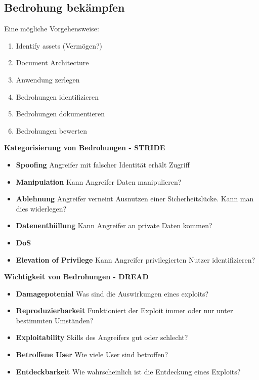 \subsection{Bedrohung bekämpfen}
Eine mögliche Vorgehensweise:
\begin{enumerate}
	\item Identify assets (Vermögen?)
	\item Document Architecture
	\item Anwendung zerlegen
	\item Bedrohungen identifizieren
	\item Bedrohungen dokumentieren
	\item Bedrohungen bewerten
\end{enumerate}

\textbf{Kategorisierung von Bedrohungen - STRIDE}
\begin{itemize}
	\item \textbf{Spoofing} Angreifer mit falscher Identität erhält Zugriff
	\item \textbf{Manipulation} Kann Angreifer Daten manipulieren?
	\item \textbf{Ablehnung} Angreifer verneint Ausnutzen einer Sicherheitslücke. Kann man dies widerlegen?
	\item \textbf{Datenenthüllung} Kann Angreifer an private Daten kommen?
	\item \textbf{DoS}
	\item \textbf{Elevation of Privilege} Kann Angreifer privilegierten Nutzer identifizieren?
\end{itemize}

\textbf{Wichtigkeit von Bedrohungen - DREAD}
\begin{itemize}
	\item \textbf{Damagepotenial} Was sind die Auswirkungen eines exploits?
	\item \textbf{Reproduzierbarkeit} Funktioniert der Exploit immer oder nur unter bestimmten Umständen?
	\item \textbf{Exploitability} Skills des Angreifers gut oder schlecht?
	\item \textbf{Betroffene User} Wie viele User sind betroffen?
	\item \textbf{Entdeckbarkeit} Wie wahrscheinlich ist die Entdeckung eines Exploits?
\end{itemize} 

